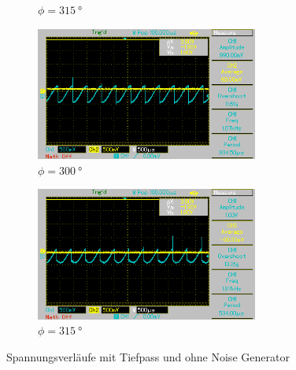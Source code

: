 \begin{figure}
\begin{subfigure}{0.5\textwidth}
    \caption{$\phi = \qty[]{315}{\degree}$}%
    \end{subfigure}%
    \hfill
    \begin{subfigure}{0.5\textwidth}%
    \centering%
    \includegraphics[width = 7.3cm]{./Oszilloskop Bilder/png/5.2/T9.png}%
    \caption{$\phi = \qty[]{300}{\degree}$}%
    \end{subfigure}%
    \hfill
    \begin{subfigure}{0.5\textwidth}%
    \centering%
    \includegraphics[width = 7.3cm]{./Oszilloskop Bilder/png/5.2/T10.png}%
    \caption{$\phi = \qty[]{315}{\degree}$}%
    \end{subfigure}%
    \caption{Spannungsverläufe mit Tiefpass und ohne Noise Generator}%
\end{figure}%

